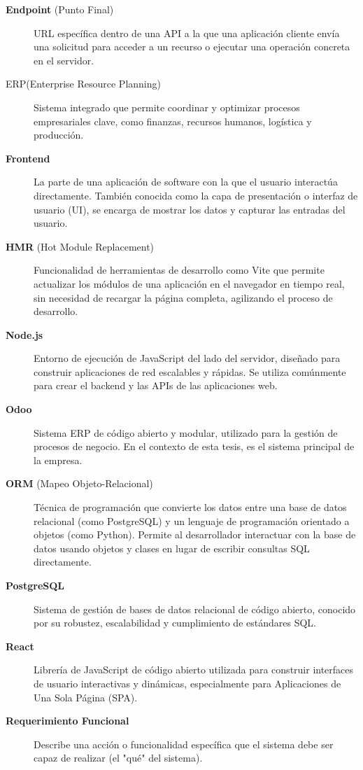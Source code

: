 \documentclass[12pt,letterpaper,spanish]{report}
\begin{document}
\begin{description}
  \item[\textbf{Endpoint} (Punto Final)] URL específica dentro de una API a la que una aplicación cliente envía una solicitud para acceder a un recurso o ejecutar una operación concreta en el servidor.
    
      
  \item[ERP(Enterprise Resource Planning)]  Sistema integrado que permite coordinar y 
        optimizar procesos empresariales clave, como finanzas, recursos humanos, logística y producción. 
    
  \item[\textbf{Frontend}] La parte de una aplicación de software con la que el usuario interactúa directamente. También conocida como la capa de presentación o interfaz de usuario (UI), se encarga de mostrar los datos y capturar las entradas del usuario.
  
  \item[\textbf{HMR} (Hot Module Replacement)] Funcionalidad de herramientas de desarrollo como Vite que permite actualizar los módulos de una aplicación en el navegador en tiempo real, sin necesidad de recargar la página completa, agilizando el proceso de desarrollo.

    
  \item[\textbf{Node.js}] Entorno de ejecución de JavaScript del lado del servidor, diseñado para construir aplicaciones de red escalables y rápidas. Se utiliza comúnmente para crear el backend y las APIs de las aplicaciones web.

  \item[\textbf{Odoo}] Sistema ERP de código abierto y modular, utilizado para la gestión de procesos de negocio. En el contexto de esta tesis, es el sistema principal de la empresa.
  
  \item[\textbf{ORM} (Mapeo Objeto-Relacional)] Técnica de programación que convierte los datos entre una base de datos relacional (como PostgreSQL) y un lenguaje de programación orientado a objetos (como Python). Permite al desarrollador interactuar con la base de datos usando objetos y clases en lugar de escribir consultas SQL directamente.

      

  \item[\textbf{PostgreSQL}] Sistema de gestión de bases de datos relacional de código abierto, conocido por su robustez, escalabilidad y cumplimiento de estándares SQL.

  \item[\textbf{React}] Librería de JavaScript de código abierto utilizada para construir interfaces de usuario interactivas y dinámicas, especialmente para Aplicaciones de Una Sola Página (SPA).
  \item[\textbf{Requerimiento Funcional}] Describe una acción o funcionalidad específica que el sistema debe ser capaz de realizar (el "qué" del sistema).


\end{description}
\end{document}
